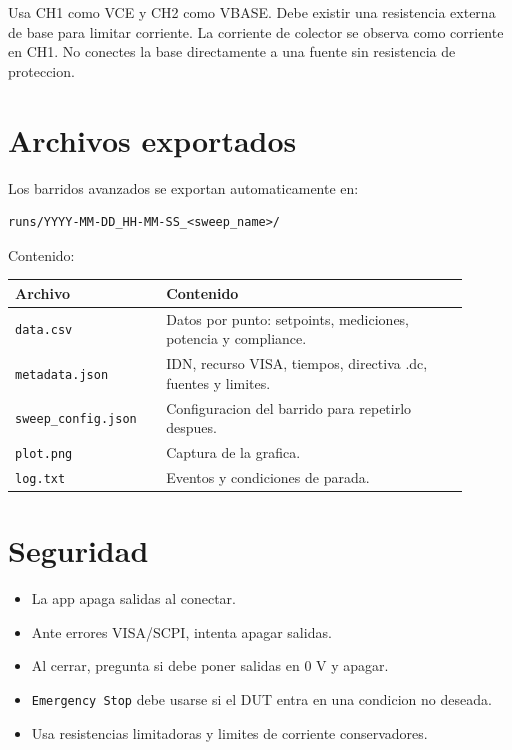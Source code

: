 \documentclass[11pt,letterpaper]{article}
\begin{document}
Usa CH1 como VCE y CH2 como VBASE. Debe existir una resistencia externa de base
para limitar corriente. La corriente de colector se observa como corriente en
CH1. No conectes la base directamente a una fuente sin resistencia de
proteccion.

\section{Archivos exportados}

Los barridos avanzados se exportan automaticamente en:

\begin{verbatim}
runs/YYYY-MM-DD_HH-MM-SS_<sweep_name>/
\end{verbatim}

Contenido:

\begin{longtable}{>{\raggedright\arraybackslash}p{0.30\linewidth}p{0.60\linewidth}}
\textbf{Archivo} & \textbf{Contenido} \\
\hline
\texttt{data.csv} & Datos por punto: setpoints, mediciones, potencia y compliance. \\
\texttt{metadata.json} & IDN, recurso VISA, tiempos, directiva .dc, fuentes y limites. \\
\texttt{sweep\_config.json} & Configuracion del barrido para repetirlo despues. \\
\texttt{plot.png} & Captura de la grafica. \\
\texttt{log.txt} & Eventos y condiciones de parada. \\
\end{longtable}

\section{Seguridad}

\begin{itemize}
  \item La app apaga salidas al conectar.
  \item Ante errores VISA/SCPI, intenta apagar salidas.
  \item Al cerrar, pregunta si debe poner salidas en 0 V y apagar.
  \item \texttt{Emergency Stop} debe usarse si el DUT entra en una condicion no deseada.
  \item Usa resistencias limitadoras y limites de corriente conservadores.
\end{itemize}
\end{document}
